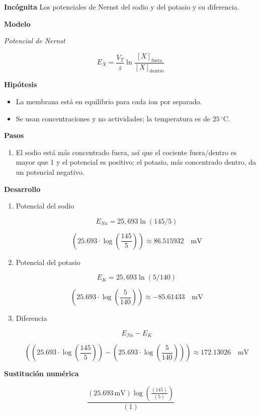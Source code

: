 \documentclass{book}
\begin{document}
\noindent\textbf{Incógnita}
Los potenciales de Nernst del sodio y del potasio y su diferencia.


\noindent\textbf{Modelo}

\noindent\textit{Potencial de Nernst}

\[
E_X = \frac{V_T}{z}\ln\frac{[X]_{\mathrm{fuera}}}{[X]_{\mathrm{dentro}}}
\]

\noindent\textbf{Hipótesis}
\begin{itemize}
\item La membrana está en equilibrio para cada ion por separado.
\item Se usan concentraciones y no actividades; la temperatura es de \(25\,{}^{\circ}\mathrm{C}\).
\end{itemize}

\noindent\textbf{Pasos}
\begin{enumerate}
\item
El sodio está más concentrado fuera, así que el cociente fuera/dentro es mayor que 1 y el potencial es positivo; el potasio, más concentrado dentro, da un potencial negativo.

\end{enumerate}

\noindent\textbf{Desarrollo}
\begin{enumerate}
\item
Potencial del sodio


\[
E_{Na} = 25{,}693 \ln(145/5)
\]

\[
\left(25.693\cdot \operatorname{log}\left(\frac{145}{5}\right)\right) \approx 86.515932\quad \mathrm{mV}
\]
\item
Potencial del potasio


\[
E_K = 25{,}693 \ln(5/140)
\]

\[
\left(25.693\cdot \operatorname{log}\left(\frac{5}{140}\right)\right) \approx -85.61433\quad \mathrm{mV}
\]
\item
Diferencia


\[
E_{Na} - E_K
\]

\[
\left(\left(25.693\cdot \operatorname{log}\left(\frac{145}{5}\right)\right)-\left(25.693\cdot \operatorname{log}\left(\frac{5}{140}\right)\right)\right) \approx 172.13026\quad \mathrm{mV}
\]
\end{enumerate}

\noindent\textbf{Sustitución numérica}

\[
\frac{\left(25.693\,\mathrm{mV}\right) \log{\left(\frac{\left(145\right)}{\left(5\right)} \right)}}{\left(1\right)}
\]
\end{document}

